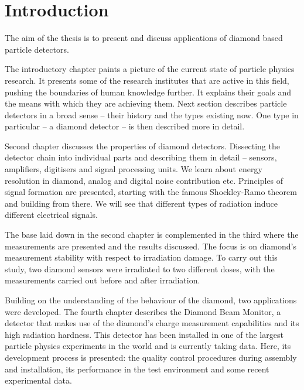 \documentclass[twoside,12pt]{packages/mytustyle}  %
\begin{document}
\baselineskip=15pt



\chapter{Introduction}


The aim of the thesis is to present and discuss applications of diamond based particle detectors. 

The introductory chapter paints a picture of the current state of particle physics research. It presents some of the research institutes that are active in this field, pushing the boundaries of human knowledge further. It explains their goals and the means with which they are achieving them. Next section describes particle detectors in a broad sense -- their history and the types existing now. One type in particular -- a diamond detector -- is then described more in detail.

Second chapter discusses the properties of diamond detectors. Dissecting the detector chain into individual parts and describing them in detail -- sensors, amplifiers, digitisers and signal processing units. We learn about energy resolution in diamond, analog and digital noise contribution etc. Principles of signal formation are presented, starting with the famous Shockley-Ramo theorem and building from there. We will see that different types of radiation induce different electrical signals.

The base laid down in the second chapter is complemented in the third where the measurements are presented and the results discussed. The focus is on diamond's measurement stability with respect to irradiation damage. To carry out this study, two diamond sensors were irradiated to two different doses, with the measurements carried out before and after irradiation.

Building on the understanding of the behaviour of the diamond, two applications were developed. The fourth chapter describes the Diamond Beam Monitor, a detector that makes use of the diamond's charge measurement capabilities and its high radiation hardness. This detector has been installed in one of the largest particle physics experiments in the world and is currently taking data. Here, its development process is presented: the quality control procedures during assembly and installation, its performance in the test environment and some recent experimental data.
\end{document}
